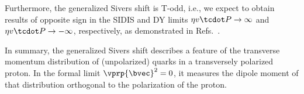 Furthermore, the generalized Sivers shift is T-odd, i.e., we expect to obtain results of opposite sign in the SIDIS and DY limits $\eta v \tcdot P \rightarrow \infty$ and $\eta v \tcdot P \rightarrow -\infty$, respectively, as demonstrated in Refs.~\cite{Musch:2011er,Yoon:2017qzo}.

In summary, the generalized Sivers shift describes a feature of the transverse momentum distribution of (unpolarized) quarks in a transversely polarized proton. In the formal limit $\vprp{\bvec}^2 = 0$, it measures the dipole moment of that distribution orthogonal to the polarization of the proton.
